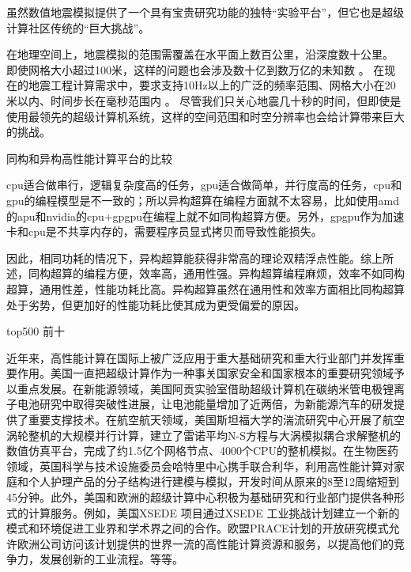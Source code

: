 \documentclass[degree=doctor]{thuthesis}
\begin{document}
虽然数值地震模拟提供了一个具有宝贵研究功能的独特“实验平台”，但它也是超级计算社区传统的“巨大挑战”。

在地理空间上，地震模拟的范围需覆盖在水平面上数百公里，沿深度数十公里。 即使网格大小超过100米，这样的问题也会涉及数十亿到数万亿的未知数 \citep{cui2010scalable}。 在现在的地震工程计算需求中，要求支持10Hz以上的广泛的频率范围、网格大小在20米以内、时间步长在毫秒范围内  \citep{cui2013physics}。 尽管我们只关心地震几十秒的时间，但即使是使用最领先的超级计算机系统，这样的空间范围和时空分辨率也会给计算带来巨大的挑战。

同构和异构高性能计算平台的比较

cpu适合做串行，逻辑复杂度高的任务，gpu适合做简单，并行度高的任务，cpu和gpu的编程模型是不一致的；所以异构超算在编程方面就不太容易，比如使用amd的apu和nvidia的cpu+gpgpu在编程上就不如同构超算方便。另外，gpgpu作为加速卡和cpu是不共享内存的，需要程序员显式拷贝而导致性能损失。


因此，相同功耗的情况下，异构超算能获得非常高的理论双精浮点性能。综上所述，同构超算的编程方便，效率高，通用性强。异构超算编程麻烦，效率不如同构超算，通用性差，性能功耗比高。异构超算虽然在通用性和效率方面相比同构超算处于劣势，但更加好的性能功耗比使其成为更受偏爱的原因。

top500 前十


近年来，高性能计算在国际上被广泛应用于重大基础研究和重大行业部门并发挥重要作用。美国一直把超级计算作为一种事关国家安全和国家根本的重要研究领域予以重点发展。在新能源领域，美国阿贡实验室借助超级计算机在碳纳米管电极锂离子电池研究中取得突破性进展，让电池能量增加了近两倍，为新能源汽车的研发提供了重要支撑技术。在航空航天领域，美国斯坦福大学的湍流研究中心开展了航空涡轮整机的大规模并行计算，建立了雷诺平均N-S方程与大涡模拟耦合求解整机的数值仿真平台，完成了约1.5亿个网格节点、4000个CPU的整机模拟。在生物医药领域，英国科学与技术设施委员会哈特里中心携手联合利华，利用高性能计算对家庭和个人护理产品的分子结构进行建模与模拟，开发时间从原来的8至12周缩短到45分钟。此外，美国和欧洲的超级计算中心积极为基础研究和行业部门提供各种形式的计算服务。例如，美国XSEDE 项目通过XSEDE 工业挑战计划建立一个新的模式和环境促进工业界和学术界之间的合作。欧盟PRACE计划的开放研究模式允许欧洲公司访问该计划提供的世界一流的高性能计算资源和服务，以提高他们的竞争力，发展创新的工业流程。等等。
\end{document}
